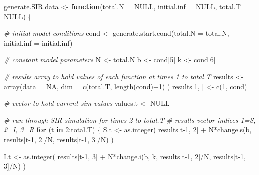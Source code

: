 \documentclass[
]{article}
\newenvironment{Shaded}{\begin{snugshade}}{\end{snugshade}}
\newcommand{\AttributeTok}[1]{\textcolor[rgb]{0.77,0.63,0.00}{#1}}
\newcommand{\CommentTok}[1]{\textcolor[rgb]{0.56,0.35,0.01}{\textit{#1}}}
\newcommand{\ConstantTok}[1]{\textcolor[rgb]{0.00,0.00,0.00}{#1}}
\newcommand{\ControlFlowTok}[1]{\textcolor[rgb]{0.13,0.29,0.53}{\textbf{#1}}}
\newcommand{\DecValTok}[1]{\textcolor[rgb]{0.00,0.00,0.81}{#1}}
\newcommand{\FunctionTok}[1]{\textcolor[rgb]{0.00,0.00,0.00}{#1}}
\newcommand{\NormalTok}[1]{#1}
\newcommand{\OtherTok}[1]{\textcolor[rgb]{0.56,0.35,0.01}{#1}}
\newcommand{\SpecialCharTok}[1]{\textcolor[rgb]{0.00,0.00,0.00}{#1}}
\begin{document}
\begin{Shaded}
\begin{Highlighting}[]
\NormalTok{generate.SIR.data }\OtherTok{\textless{}{-}} \ControlFlowTok{function}\NormalTok{(}\AttributeTok{total.N =} \ConstantTok{NULL}\NormalTok{, }\AttributeTok{initial.inf =} \ConstantTok{NULL}\NormalTok{, }\AttributeTok{total.T =} \ConstantTok{NULL}\NormalTok{) \{}
  
  \CommentTok{\# initial model conditions}
\NormalTok{  cond }\OtherTok{\textless{}{-}} \FunctionTok{generate.start.cond}\NormalTok{(}\AttributeTok{total.N =}\NormalTok{ total.N, }\AttributeTok{initial.inf =}\NormalTok{ initial.inf)}
  
  \CommentTok{\# constant model parameters}
\NormalTok{  N    }\OtherTok{\textless{}{-}}\NormalTok{ total.N}
\NormalTok{  b    }\OtherTok{\textless{}{-}}\NormalTok{ cond[}\DecValTok{5}\NormalTok{]}
\NormalTok{  k    }\OtherTok{\textless{}{-}}\NormalTok{ cond[}\DecValTok{6}\NormalTok{]}
  
  \CommentTok{\# results array to hold values of each function at times 1 to total.T}
\NormalTok{  results }\OtherTok{\textless{}{-}} \FunctionTok{array}\NormalTok{(}\AttributeTok{data =} \ConstantTok{NA}\NormalTok{, }\AttributeTok{dim =} \FunctionTok{c}\NormalTok{(total.T, }\FunctionTok{length}\NormalTok{(cond)}\SpecialCharTok{+}\DecValTok{1}\NormalTok{) )}
\NormalTok{  results[}\DecValTok{1}\NormalTok{, ] }\OtherTok{\textless{}{-}} \FunctionTok{c}\NormalTok{(}\DecValTok{1}\NormalTok{, cond)}
  
  \CommentTok{\# vector to hold current sim values}
\NormalTok{  values.t }\OtherTok{\textless{}{-}} \ConstantTok{NULL}
  
  \CommentTok{\# run through SIR simulation for times 2 to total.T}
  \CommentTok{\# results vector indices 1=S, 2=I, 3=R}
  \ControlFlowTok{for}\NormalTok{ (t }\ControlFlowTok{in} \DecValTok{2}\SpecialCharTok{:}\NormalTok{total.T) \{}
\NormalTok{    S.t }\OtherTok{\textless{}{-}} \FunctionTok{as.integer}\NormalTok{( results[t}\DecValTok{{-}1}\NormalTok{, }\DecValTok{2}\NormalTok{] }\SpecialCharTok{+}\NormalTok{ N}\SpecialCharTok{*}\FunctionTok{change.s}\NormalTok{(b,    results[t}\DecValTok{{-}1}\NormalTok{, }\DecValTok{2}\NormalTok{]}\SpecialCharTok{/}\NormalTok{N, results[t}\DecValTok{{-}1}\NormalTok{, }\DecValTok{3}\NormalTok{]}\SpecialCharTok{/}\NormalTok{N) )}
    
\NormalTok{    I.t }\OtherTok{\textless{}{-}} \FunctionTok{as.integer}\NormalTok{( results[t}\DecValTok{{-}1}\NormalTok{, }\DecValTok{3}\NormalTok{] }\SpecialCharTok{+}\NormalTok{ N}\SpecialCharTok{*}\FunctionTok{change.i}\NormalTok{(b, k, results[t}\DecValTok{{-}1}\NormalTok{, }\DecValTok{2}\NormalTok{]}\SpecialCharTok{/}\NormalTok{N, results[t}\DecValTok{{-}1}\NormalTok{, }\DecValTok{3}\NormalTok{]}\SpecialCharTok{/}\NormalTok{N) )}
    

\end{Highlighting}
\end{Shaded}
\end{document}
